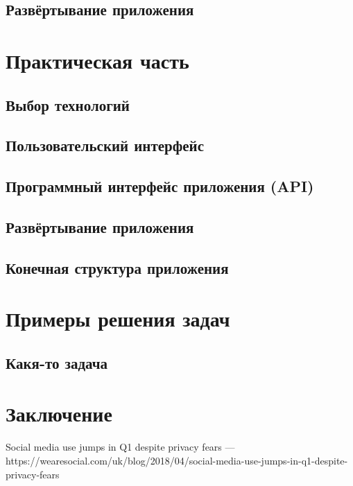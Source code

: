 \documentclass[14pt,a4paper]{scrartcl}
\begin{document}
    \subsection[Развёртывание приложения]{Развёртывание приложения}

    \newpage
    \section[Практическая часть]{Практическая часть}
    \subsection[Выбор технологий]{Выбор технологий}
    \subsection[Пользовательский интерфейс]{Пользовательский интерфейс}
    \subsection[Программный интерфейс приложения]{Программный интерфейс приложения (API)}
    \subsection[Развёртывание приложения]{Развёртывание приложения}
    \subsection[Конечная структура приложения]{Конечная структура приложения}

    \newpage
    \section[Примеры решения задач]{Примеры решения задач}
    \subsection[Какя-то задача]{Какя-то задача}

    \newpage
    \section[Заключение]{Заключение}

    \newpage
    \begin{thebibliography}{9}
        Social media use jumps in Q1 despite privacy fears
        \newblock --- https://wearesocial.com/uk/blog/2018/04/social-media-use-jumps-in-q1-despite-privacy-fears
    \end{thebibliography}
\end{document}
